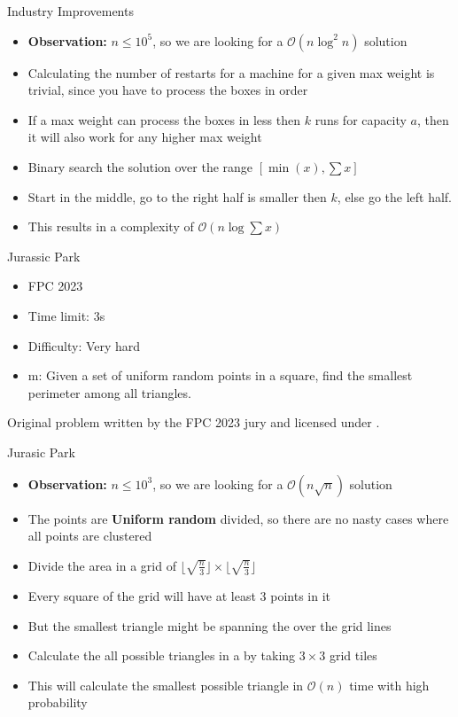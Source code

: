 \documentclass[11pt,pdf, aspectratio=169]{beamer}
\begin{document}
  \begin{frame}{Industry Improvements}
    \begin{itemize}
      \item<1-> \textbf{Observation:} $n \leq  10^5$, so we are looking for a $\mathcal{O}(n \log^2 n)$ solution
      \item<2-> Calculating the number of restarts for a machine for a given max weight is trivial, since you have to process the boxes in order
      \item<3-> If a max weight can process the boxes in less then $k$ runs for capacity $a$, then it will also work for any higher max weight
      \item<4-> Binary search the solution over the range $[\min(x), \sum x]$
      \item<4-> Start in the middle, go to the right half is smaller then $k$, else go the left half.
      \item<5-> This results in a complexity of $\mathcal{O}(n \log \sum x)$
    \end{itemize}
  \end{frame}
  \begin{frame}{ Jurassic Park}
    \begin{itemize}
      \item FPC 2023
      \item Time limit: 3s
      \item Difficulty: Very hard
      \item m: Given a set of uniform random points in a square, find the smallest perimeter among all triangles.

    \end{itemize}
    Original problem written by the FPC 2023 jury and licensed under \doclicenseLongNameRef.

    \doclicenseImage

  \end{frame}
  \begin{frame}{Jurasic Park}
    \begin{itemize}
      \item<1-> \textbf{Observation:} $n \leq  10^3$, so we are looking for a $\mathcal{O}(n \sqrt {n})$ solution
      \item<2-> The points are \textbf{Uniform random} divided, so there are no nasty cases where all points are clustered
      \item<3-> Divide the area in a grid of $\lfloor\sqrt {\frac{n}{3}} \rfloor \times \lfloor\sqrt {\frac{n}{3}} \rfloor$
      \item<4-> Every square of the grid will have at least 3 points in it
      \item<4-> But the smallest triangle might be spanning the over the grid lines
      \item<5-> Calculate the all possible triangles in a by taking $3\times 3$ grid tiles
      \item<6-> This will calculate the smallest possible triangle in $\mathcal{O}(n)$ time with high probability
    \end{itemize}
  \end{frame}
\end{document}
